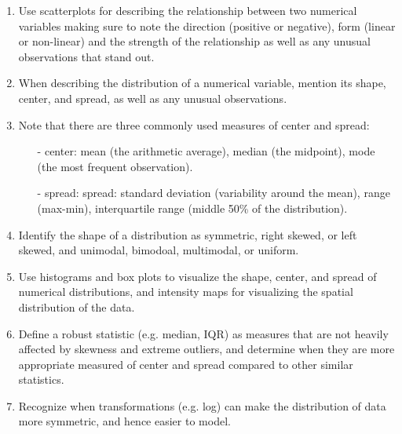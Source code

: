 \documentclass[11pt]{article}
\begin{document}
\begin{enumerate}[resume]
\renewcommand\labelenumi{\textcolor{light}{\textbf{LO \theenumi.}}}
\item Use scatterplots for describing the relationship between two numerical variables making sure to note the direction (positive or negative), form (linear or non-linear) and the strength of the relationship as well as any unusual observations that stand out.
\item When describing the distribution of a numerical variable, mention its shape, center, and spread, as well as any unusual observations.
\item Note that there are three commonly used measures of center and spread: 
\begin{itemize}
\item[-] center: mean (the arithmetic average), median (the midpoint), mode (the most frequent observation).
\item[-] spread: spread: standard deviation (variability around the mean), range (max-min), interquartile range (middle 50\% of the distribution).
\end{itemize}
\item Identify the shape of a distribution as symmetric, right skewed, or left skewed, and unimodal, bimodoal, multimodal, or uniform.
\item Use histograms and box plots to visualize the shape, center, and spread of numerical distributions, and intensity maps for visualizing the spatial distribution of the data.
\item Define a robust statistic (e.g. median, IQR) as measures that are not heavily affected by skewness and extreme outliers, and determine when they are more appropriate measured of center and spread compared to other similar statistics.
\item Recognize when transformations (e.g. log) can make the distribution of data more symmetric, and hence easier to model.
\end{enumerate}
\end{document}
